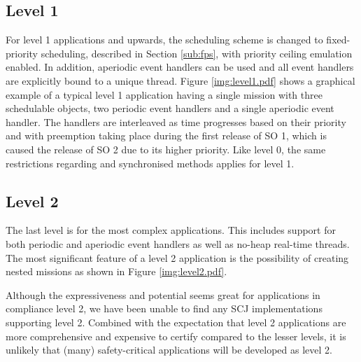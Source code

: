 \subsection{Level 1}
For level 1 applications and upwards, the scheduling scheme is changed to fixed-priority scheduling, described in Section \ref{sub:fps}, with priority ceiling emulation enabled. In addition, aperiodic event handlers can be used and all event handlers are explicitly bound to a unique thread. Figure \ref{img:level1.pdf} shows a graphical example of a typical level 1 application having a single mission with three schedulable objects, two periodic event handlers and a single aperiodic event handler. The handlers are interleaved as time progresses based on their priority and with preemption taking place during the first release of SO 1, which is caused the release of SO 2 due to its higher priority. Like level 0, the same restrictions regarding  and synchronised methods applies for level 1.


\subsection{Level 2}
The last level is for the most complex applications. This includes support for both periodic and aperiodic event handlers as well as no-heap real-time threads. The most significant feature of a level 2 application is the possibility of creating nested missions as shown in Figure \ref{img:level2.pdf}.


Although the expressiveness and potential seems great for applications in compliance level 2, we have been unable to find any SCJ implementations supporting level 2. Combined with the expectation that level 2 applications are more comprehensive and expensive to certify compared to the lesser levels, it is unlikely that (many) safety-critical applications will be developed as level 2.
